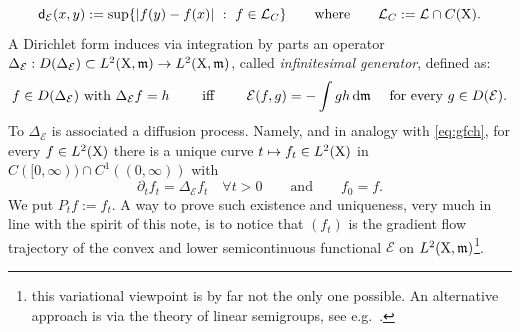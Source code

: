 \documentclass[11pt]{article}
\numberwithin{equation}{section}
\newcommand{\X}{{\rm X}}
\newcommand{\sfd}{{\sf d}}
\newcommand{\mm}{{\mathfrak m}}
\renewcommand{\d}{{\rm d}}
\begin{document}
\begin{equation}
\label{eq:defde}
\sfd_\mathcal E(x,y):=\sup\{|f(y)-f(x)|\ :\ f\in \mathcal L_C\}\qquad\text{where}\qquad \mathcal L_C:=\mathcal L\cap C(\X).
\end{equation}
A Dirichlet form induces via integration by parts an operator $\Delta_{\mathcal E}:D(\Delta_{\mathcal E})\subset L^2(\X,\mm)\to L^2(\X,\mm)$, called \emph{infinitesimal generator}, defined as: 
\[
\text{$f\in D(\Delta_{\mathcal E})$ with $\Delta_{\mathcal E}f=h\qquad $ iff $\qquad \mathcal E(f,g)=-\int gh\,\d\mm\quad$ for every $g\in D(\mathcal E)$}.
\] 
To $\Delta_{\mathcal E}$ is associated  a diffusion process. Namely, and in analogy with \eqref{eq:gfch}, for every $f\in L^2(\X)$ there is  a unique curve $t\mapsto f_t\in L^2(\X) $ in $C([0,\infty))\cap C^1((0,\infty))$ with 
\[
\partial_tf_t=\Delta_{\mathcal E}f_t\quad\forall t>0\qquad \text{and}\qquad f_0=f.
\]
We put $P_tf:=f_t$. A way to prove such existence and uniqueness, very much in line with the spirit of this note, is to notice that $(f_t)$ is the gradient flow trajectory of the convex and lower semicontinuous functional $\mathcal E$ on $L^2(\X,\mm)$\footnote{this variational viewpoint is by far not the only one possible. An alternative approach is via the theory of linear semigroups, see e.g.\ \cite{Paz}.}.
\end{document}
